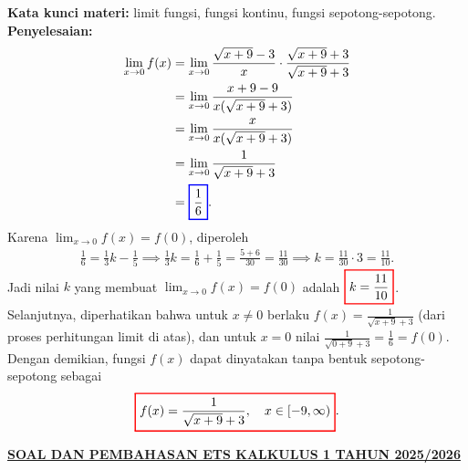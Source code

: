 \documentclass[10pt,openany,a4paper]{article}
\theoremstyle{definition}
\theoremstyle{definition}
\theoremstyle{plain}
\newenvironment{jawab}[2][tes]{%
\par\noindent\textbf{Kata kunci materi:} #1.\\
\textbf{Penyelesaian:} #2%
}{}
\begin{document}
\begin{enumerate}
\begin{jawab}[limit fungsi, fungsi kontinu, fungsi sepotong-sepotong]
{\begin{align*}
                \lim_{x\to 0} f(x)&=\lim_{x\to 0}\frac{\sqrt{x+9}-3}{x}\cdot\frac{\sqrt{x+9}+3}{\sqrt{x+9}+3}\\
                &=\lim_{x\to 0}\frac{x+9-9}{x(\sqrt{x+9}+3)}\\
                &=\lim_{x\to 0}\frac{x}{x(\sqrt{x+9}+3)}\\
                &=\lim_{x\to 0}\frac{1}{\sqrt{x+9}+3}\\
                &=\colorlet{oldcolor}{.}
        \color{blue}
        \setlength{\fboxrule}{1pt} \boxed{\color{oldcolor}\frac{1}{6}}\color{oldcolor}.
            \end{align*}
            Karena $\displaystyle\lim_{x \to 0} f(x) = f(0)$, diperoleh
            \begin{align*}
                \frac{1}{6} = \frac{1}{3}k-\frac{1}{5} \implies \frac{1}{3}k = \frac{1}{6} + \frac{1}{5} = \frac{5+6}{30} = \frac{11}{30} \implies k = \frac{11}{30} \cdot 3 = \frac{11}{10}.
            \end{align*}
            Jadi nilai $k$ yang membuat $\lim_{x \to 0} f(x) = f(0)$ adalah $\colorlet{oldcolor}{.}
        \color{red}
        \setlength{\fboxrule}{1pt} \boxed{\color{oldcolor}k = \frac{11}{10}}\color{oldcolor}$.
        Selanjutnya, diperhatikan bahwa untuk $x\neq 0$ berlaku $f(x)=\frac{1}{\sqrt{x+9}+3}$ (dari proses perhitungan limit di atas), dan untuk $x=0$ nilai $\frac{1}{\sqrt{0+9}+3}=\frac{1}{6}=f(0)$. Dengan demikian, fungsi $f(x)$ dapat dinyatakan tanpa bentuk sepotong-sepotong sebagai
        \begin{align*}
            \colorlet{oldcolor}{.}
        \color{red}
        \setlength{\fboxrule}{1pt} \boxed{\color{oldcolor}f(x) = \frac{1}{\sqrt{x+9}+3}, \quad x \in [-9,\infty)}\color{oldcolor}.
        \end{align*}
    }
    \end{jawab}
\end{enumerate}
\newpage
 \begin{center}
	{\underline{\textbf{\MakeUppercase{Soal dan Pembahasan ETS Kalkulus 1 Tahun 2025/2026}}}}
    \end{center}
\end{document}
